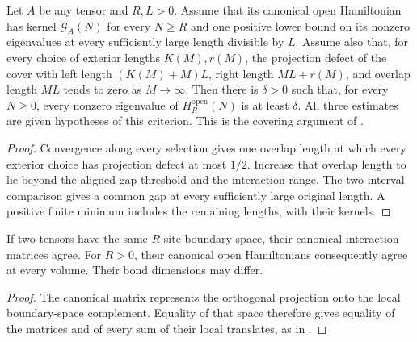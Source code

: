 \begin{lemma}
    \label{thm:aligned_residue_cover_gap_limit}
    \leanok
    Let $A$ be any tensor and $R,L>0$. Assume that its canonical open
    Hamiltonian has kernel $\mathcal G_A(N)$ for every $N\geq R$ and one
    positive lower bound on its nonzero eigenvalues at every sufficiently
    large length divisible by $L$.
    Assume also that, for every choice of exterior lengths $K(M),r(M)$,
    the projection defect of the cover with left length $(K(M)+M)L$,
    right length $ML+r(M)$, and overlap length $ML$ tends to zero as
    $M\to\infty$. Then there is $\delta>0$ such that, for every
    $N\geq0$, every nonzero eigenvalue of $H_R^{\mathrm{open}}(N)$ is at
    least $\delta$.
    All three estimates are given hypotheses of this criterion.
    This is the covering argument of
    \cite[Section~6]{Nachtergaele1996Spectral}.
\end{lemma}
\begin{proof}\leanok
    Convergence along every selection gives one overlap length at which
    every exterior choice has projection defect at most $1/2$.
    Increase that overlap length to lie beyond the aligned-gap threshold
    and the interaction range. The two-interval comparison gives a common
    gap at every sufficiently large original length. A positive finite
    minimum includes the remaining lengths, with their kernels.
\end{proof}

\begin{lemma}
    \label{lem:canonical_interaction_support_transport}
    \leanok
    If two tensors have the same $R$-site boundary space, their canonical
    interaction matrices agree. For $R>0$, their canonical open Hamiltonians
    consequently agree at every volume. Their bond dimensions may differ.
\end{lemma}
\begin{proof}\leanok
    The canonical matrix represents the orthogonal projection onto the
    local boundary-space complement. Equality of that space therefore gives
    equality of the matrices and of every sum of their local translates,
    as in \cite[Lemma \texttt{existenceinteraction}]{Nachtergaele1996Spectral}.
\end{proof}

